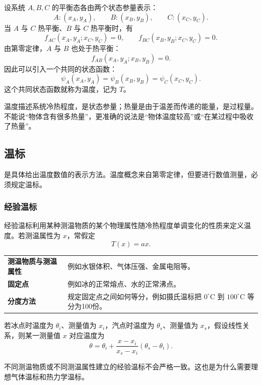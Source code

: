 设系统 \(A,B,C\) 的平衡态各由两个状态参量表示：
\[
  A:(x_A,y_A),\qquad B:(x_B,y_B),\qquad C:(x_C,y_C).
\]
当 \(A\) 与 \(C\) 热平衡、\(B\) 与 \(C\) 热平衡时，有
\[
  f_{AC}(x_A,y_A;x_C,y_C)=0,\qquad
  f_{BC}(x_B,y_B;x_C,y_C)=0.
\]
由第零定律，\(A\) 与 \(B\) 也处于热平衡：
\[
  f_{AB}(x_A,y_A;x_B,y_B)=0.
\]
因此可以引入一个共同的状态函数：
\[
  \psi_A(x_A,y_A)=\psi_B(x_B,y_B)=\psi_C(x_C,y_C).
\]
这个共同状态函数就称为温度，记为 \(T\)。

\begin{WarnBox}
温度描述系统冷热程度，是状态参量；热量是由于温差而传递的能量，是过程量。不能说“物体含有很多热量”，更准确的说法是“物体温度较高”或“在某过程中吸收了热量”。
\end{WarnBox}

\subsection{温标}

是具体给出温度数值的表示方法。温度概念来自第零定律，但要进行数值测量，必须规定温标。

\subsubsection{经验温标}

经验温标利用某种测温物质的某个物理属性随冷热程度单调变化的性质来定义温度。若测温属性为 \(x\)，常假定
\[
  T(x)=a x.
\]

\begin{FormulaBox}[经验温标的三个要素]
\begin{tabularx}{\textwidth}{@{}>{\bfseries}lX@{}}
测温物质与测温属性 & 例如水银体积、气体压强、金属电阻等。\\
固定点 & 例如冰的正常熔点、水的正常沸点。\\
分度方法 & 规定固定点之间如何等分，例如摄氏温标把 \(0^\circ\mathrm C\) 到 \(100^\circ\mathrm C\) 等分为100份。\\
\end{tabularx}
\end{FormulaBox}

若冰点时温度为 \(\theta_i\)、测量值为 \(x_i\)，汽点时温度为 \(\theta_s\)、测量值为 \(x_s\)，假设线性关系，则某一测量值 \(x\) 对应温度为
\[
  \theta
  =
  \theta_i+
  \frac{x-x_i}{x_s-x_i}(\theta_s-\theta_i).
\]

\begin{WarnBox}[经验温标的局限]
不同测温物质或不同测温属性建立的经验温标不会严格一致。这也是为什么需要理想气体温标和热力学温标。
\end{WarnBox}

